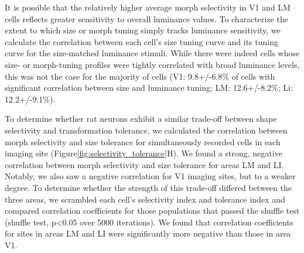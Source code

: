 It is possible that the relatively higher average morph selectivity in V1 and LM cells reflects greater sensitivity to overall luminance values. To characterize the extent to which size or morph tuning simply tracks luminance sensitivity, we calculate the correlation between each cell's size tuning curve and its tuning curve for the size-matched luminance stimuli. While there were indeed cells whose size- or morph-tuning profiles were tightly correlated with broad luminance levels, this was not the case for the majority of cells (V1: 9.8+/-6.8\% of cells with significant correlation between size and luminance tuning; LM: 12.6+/-8.2\%; Li: 12.2+/-9.1\%). 

To determine whether rat neurons exhibit a similar trade-off between shape selectivity and transformation tolerance, we calculated the correlation between morph selectivity and size tolerance for simultaneously recorded cells in each imaging site (Figure\ref{fig:selectivity_tolerance}H). We found a strong, negative correlation between morph selectivity and size tolerance for areas LM and LI. Notably, we also saw a negative correlation for V1 imaging sites, but to a weaker degree. To determine whether the strength of this trade-off differed between the three areas, we scrambled each cell’s selectivity index and tolerance index and compared correlation coefficients for those populations that passed the shuffle test (shuffle test, p<0.05 over 5000 iterations). We found that correlation coefficients for sites in areas LM and LI were significantly more negative than those in area V1. 


